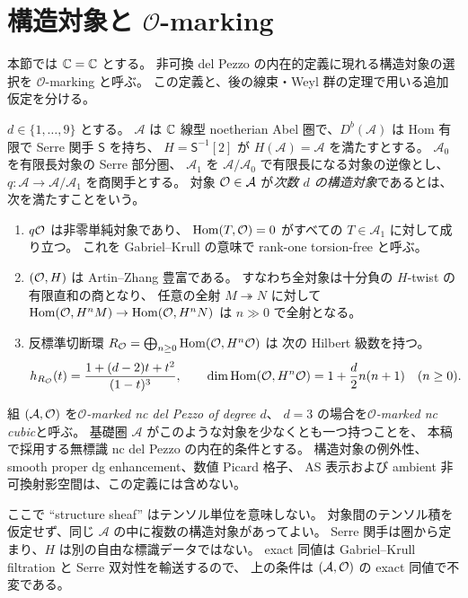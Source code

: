 \section{構造対象と $\mathcal O$-marking}\label{sec:weak-definition}
本節では $\mathbb C=\mathbb C$ とする。
非可換 del Pezzo の内在的定義に現れる構造対象の選択を
$\mathcal O$-marking と呼ぶ。
この定義と、後の線束・Weyl 群の定理で用いる追加仮定を分ける。

\begin{definition}
\label{def:o-marked-cubic}
$d\in\{1,\ldots,9\}$ とする。
$\mathcal A$ は $\mathbb C$ 線型 noetherian Abel 圏で、$D^b(\mathcal A)$ は
Hom 有限で Serre 関手 $\mathsf S$ を持ち、
$H=\mathsf S^{-1}[2]$ が $H(\mathcal A)=\mathcal A$ を満たすとする。
$\mathcal A_0$ を有限長対象の Serre 部分圏、
$\mathcal A_1$ を $\mathcal A/\mathcal A_0$ で有限長になる対象の逆像とし、
$q:\mathcal A\to\mathcal A/\mathcal A_1$ を商関手とする。
対象 $\mathcal O\in\mathcal A$ が\emph{次数 $d$ の構造対象}であるとは、次を満たすことをいう。
\begin{enumerate}
\item $q\mathcal O$ は非零単純対象であり、
      $\operatorname{Hom}(T,\mathcal O)=0$ がすべての $T\in\mathcal A_1$ に対して成り立つ。
      これを Gabriel--Krull の意味で rank-one torsion-free と呼ぶ。
\item $(\mathcal O,H)$ は Artin--Zhang 豊富である。
      すなわち全対象は十分負の $H$-twist の有限直和の商となり、
      任意の全射 $M\twoheadrightarrow N$ に対して
      $\operatorname{Hom}(\mathcal O,H^nM)\to\operatorname{Hom}(\mathcal O,H^nN)$ は $n\gg0$ で全射となる。
\item 反標準切断環 $R_{\mathcal O}=\bigoplus_{n\ge0}\operatorname{Hom}(\mathcal O,H^n\mathcal O)$ は
      次の Hilbert 級数を持つ。
      \begin{equation}\label{eq:o-del-pezzo-hilbert}
       h_{R_{\mathcal O}}(t)=\frac{1+(d-2)t+t^2}{(1-t)^3},\qquad
       \dim\operatorname{Hom}(\mathcal O,H^n\mathcal O)=1+\frac d2n(n+1)\quad(n\ge0).
      \end{equation}
\end{enumerate}
組 $(\mathcal A,\mathcal O)$ を\emph{$\mathcal O$-marked nc del Pezzo of degree $d$}、
$d=3$ の場合を\emph{$\mathcal O$-marked nc cubic}と呼ぶ。
基礎圏 $\mathcal A$ がこのような対象を少なくとも一つ持つことを、
本稿で採用する無標識 nc del Pezzo の内在的条件とする。
構造対象の例外性、smooth proper dg enhancement、数値 Picard 格子、
AS 表示および ambient 非可換射影空間は、この定義には含めない。
\end{definition}

ここで ``structure sheaf'' はテンソル単位を意味しない。
対象間のテンソル積を仮定せず、同じ $\mathcal A$ の中に複数の構造対象があってよい。
Serre 関手は圏から定まり、$H$ は別の自由な標識データではない。
exact 同値は Gabriel--Krull filtration と Serre 双対性を輸送するので、
上の条件は $(\mathcal A,\mathcal O)$ の exact 同値で不変である。

